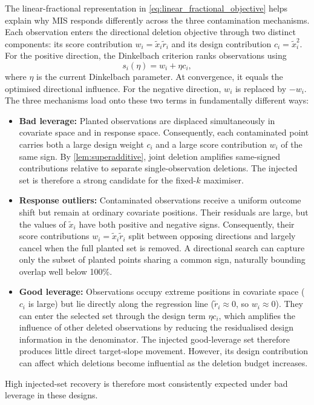 \documentclass[../main.tex]{subfiles}
\begin{document}
The linear-fractional representation in \autoref{eq:linear_fractional_objective} helps explain why MIS responds differently across the three contamination mechanisms. Each observation enters the directional deletion objective through two distinct components: its score contribution $w_i = \tilde{x}_i \tilde{r}_i$ and its design contribution $c_i = \tilde{x}_i^2$. For the positive direction, the Dinkelbach criterion ranks observations using
\begin{equation}
	s_i(\eta) = w_i + \eta c_i,
	\label{eq:dinkelbach_score}
\end{equation}
where $\eta$ is the current Dinkelbach parameter. At convergence, it equals the optimised directional influence. For the negative direction, $w_i$ is replaced by $-w_i$. The three mechanisms load onto these two terms in fundamentally different ways:
\begin{itemize}
	\item \textbf{Bad leverage:} Planted observations are displaced simultaneously in covariate space and in response space. Consequently, each contaminated point carries both a large design weight $c_i$ and a large score contribution $w_i$ of the same sign. By \autoref{lem:superadditive}, joint deletion amplifies same-signed contributions relative to separate single-observation deletions. The injected set is therefore a strong candidate for the fixed-\(k\) maximiser.
	\item \textbf{Response outliers:} Contaminated observations receive a uniform outcome shift but remain at ordinary covariate positions. Their residuals are large, but the values of $\widetilde{x}_i$ have both positive and negative signs. Consequently, their score contributions $w_i = \tilde{x}_i \tilde{r}_i$ split between opposing directions and largely cancel when the full planted set is removed. A directional search can capture only the subset of planted points sharing a common sign, naturally bounding overlap well below 100\%.
	\item \textbf{Good leverage:} Observations occupy extreme positions in covariate space ($c_i$ is large) but lie directly along the regression line ($\tilde{r}_i \approx 0$, so $w_i \approx 0$). They can enter the selected set through the design term $\eta c_i$, which amplifies the influence of other deleted observations by reducing the residualised design information in the denominator. The injected good-leverage set therefore produces little direct target-slope movement. However, its design contribution can affect which deletions become influential as the deletion budget increases.
\end{itemize}
High injected-set recovery is therefore most consistently expected under bad leverage in these designs.
\end{document}
